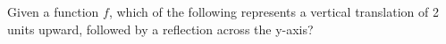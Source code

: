 \documentclass{ximera}
\author{David Kish}
\begin{document}
\begin{exercise}
Given a function $f$, which of the following represents a vertical translation of 2 units upward, followed by a reflection across the y-axis?

\begin{multipleChoice}  
\end{multipleChoice}  

\end{exercise}
\end{document}
